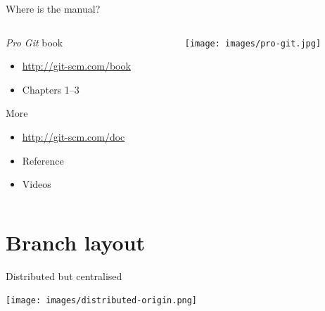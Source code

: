 \documentclass{beamer}
\begin{document}
\begin{frame}{Where is the manual?}
  \begin{columns}
    \begin{column}[t]{6cm}
      \begin{block}{\emph{Pro Git} book}
        \begin{itemize}
        \item \url{http://git-scm.com/book}
        \item Chapters 1--3
        \end{itemize}
      \end{block}
      \begin{block}{More}
        \begin{itemize}
        \item \url{http://git-scm.com/doc}
        \item Reference
        \item Videos
        \end{itemize}
      \end{block}
    \end{column}
    \begin{column}[t]{3cm}
      \begin{center}
        \texttt{[image: images/pro-git.jpg]}
      \end{center}
    \end{column}
  \end{columns}
\end{frame}

\section{Branch layout}
\begin{frame}{Distributed but centralised}
  \begin{center}
    \texttt{[image: images/distributed-origin.png]}
  \end{center}
\end{frame}
\end{document}
